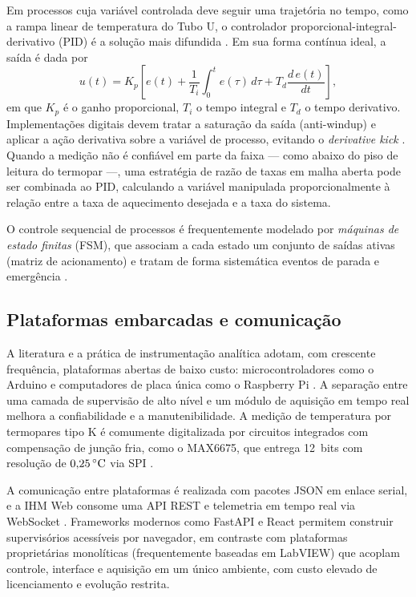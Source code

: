 Em processos cuja vari\'avel controlada deve seguir uma trajet\'oria no tempo,
como a rampa linear de temperatura do Tubo U, o controlador
proporcional-integral-derivativo (PID) \'e a solu\c{c}\~ao mais difundida
\cite{astrom2006,ogata2010}. Em sua forma cont\'inua ideal, a sa\'ida \'e dada
por
\begin{equation}
  u(t) = K_p \left[ e(t) + \frac{1}{T_i}\int_0^t e(\tau)\,d\tau
         + T_d \frac{d\,e(t)}{dt} \right],
  \label{eq:pid}
\end{equation}
em que $K_p$ \'e o ganho proporcional, $T_i$ o tempo integral e $T_d$ o tempo
derivativo. Implementa\c{c}\~oes digitais devem tratar a satura\c{c}\~ao da sa\'ida
(anti-windup) e aplicar a a\c{c}\~ao derivativa sobre a vari\'avel de processo,
evitando o \emph{derivative kick} \cite{astrom2006}. Quando a medi\c{c}\~ao n\~ao
\'e confi\'avel em parte da faixa --- como abaixo do piso de leitura do termopar
---, uma estrat\'egia de raz\~ao de taxas em malha aberta pode ser combinada ao
PID, calculando a vari\'avel manipulada proporcionalmente \`a rela\c{c}\~ao entre
a taxa de aquecimento desejada e a taxa do sistema.

O controle sequencial de processos \'e frequentemente modelado por
\emph{m\'aquinas de estado finitas} (FSM), que associam a cada estado um conjunto
de sa\'idas ativas (matriz de acionamento) e tratam de forma sistem\'atica
eventos de parada e emerg\^encia \cite{wagner2006}.

\subsection{Plataformas embarcadas e comunica\c{c}\~ao}

A literatura e a pr\'atica de instrumenta\c{c}\~ao anal\'itica adotam, com
crescente frequ\^encia, plataformas abertas de baixo custo: microcontroladores
como o Arduino \cite{arduino} e computadores de placa \'unica como o Raspberry Pi
\cite{raspberrypi}. A separa\c{c}\~ao entre uma camada de supervis\~ao de alto
n\'ivel e um m\'odulo de aquisi\c{c}\~ao em tempo real melhora a confiabilidade e
a manutenibilidade. A medi\c{c}\~ao de temperatura por termopares tipo K \'e
comumente digitalizada por circuitos integrados com compensa\c{c}\~ao de
jun\c{c}\~ao fria, como o MAX6675, que entrega 12~bits com resolu\c{c}\~ao de
$0{,}25\,\celsius$ via SPI \cite{max6675,nist_its90}.

A comunica\c{c}\~ao entre plataformas \'e realizada com pacotes JSON
\cite{bray2017} em enlace serial, e a IHM Web consome uma API REST e telemetria
em tempo real via WebSocket \cite{fette2011}. Frameworks modernos como FastAPI
\cite{fastapi} e React \cite{react} permitem construir supervis\'orios acess\'iveis
por navegador, em contraste com plataformas propriet\'arias monol\'iticas
(frequentemente baseadas em LabVIEW) que acoplam controle, interface e
aquisi\c{c}\~ao em um \'unico ambiente, com custo elevado de licenciamento e
evolu\c{c}\~ao restrita.

